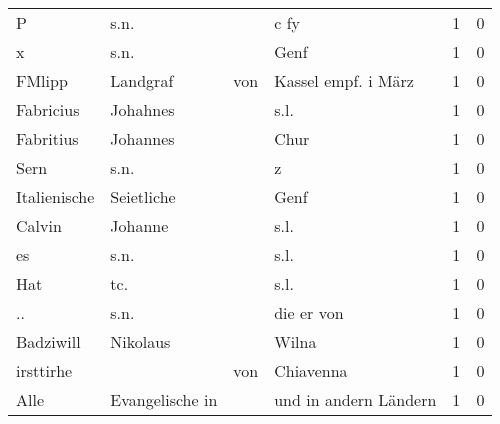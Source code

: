 \documentclass[10pt,a4paper,landscape]{article}
\begin{document}
\begin{longtable}{llllrr}
                        P &                               s.n. &             &                                        c fy &          1 &         0 \\
                        x &                               s.n. &             &                                        Genf &          1 &         0 \\
                   FMlipp &                           Landgraf &         von &                         Kassel empf. i März &          1 &         0 \\
                Fabricius &                           Johahnes &             &                                        s.l. &          1 &         0 \\
                Fabritius &                           Johannes &             &                                        Chur &          1 &         0 \\
                     Sern &                               s.n. &             &                                           z &          1 &         0 \\
             Italienische &                         Seietliche &             &                                        Genf &          1 &         0 \\
                   Calvin &                            Johanne &             &                                        s.l. &          1 &         0 \\
                       es &                               s.n. &             &                                        s.l. &          1 &         0 \\
                      Hat &                                tc. &             &                                        s.l. &          1 &         0 \\
                       .. &                               s.n. &             &                                  die er von &          1 &         0 \\
                Badziwill &                           Nikolaus &             &                                       Wilna &          1 &         0 \\
                irsttirhe &                                    &         von &                                   Chiavenna &          1 &         0 \\
                     Alle &                    Evangelische in &             &                       und in andern Ländern &          1 &         0 \\

\end{longtable}
\end{document}
